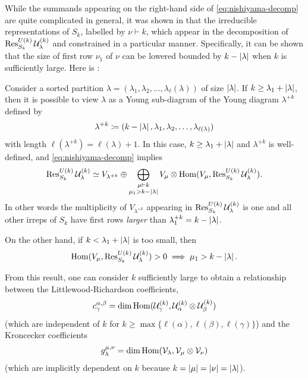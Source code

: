 \documentclass[notitlepage]{article}
\begin{document}
While the summands appearing on the right-hand side of \cref{eq:nishiyama-decomp} are quite complicated in general, it was shown in \cite{christandl2018recoupling} that the irreducible representations of $S_k$, labelled by $\nu \vdash k$, which appear in the decomposition of $\operatorname{Res}^{U(k)}_{S_k} \mathcal U_{\lambda}^{(k)}$ and constrained in a particular manner.
Specifically, it can be shown that the size of first row $\nu_1$ of $\nu$ can be lowered bounded by $k - \left|\lambda\right|$ when $k$ is sufficiently large.
Here is \cite[Lemma 13]{christandl2018recoupling}:
\begin{thm}
    Consider a sorted partition $\lambda = (\lambda_1, \lambda_2, \ldots, \lambda_\ell(\lambda))$ of size $\left|\lambda\right|$.
    If $k \geq \lambda_1 + \left|\lambda\right|$, then it is possible to view $\lambda$ as a Young sub-diagram of the Young diagram $\lambda^{+k}$ defined by
    \begin{equation}
        \lambda^{+k} \coloneqq (k - \left|\lambda\right|, \lambda_1, \lambda_2, \ldots, \lambda_{\ell(\lambda)})
    \end{equation}
    with length $\ell(\lambda^{+k}) = \ell(\lambda) + 1$.
    In this case, $k \geq \lambda_1 + \left|\lambda\right|$ and $\lambda^{+k}$ is well-defined, and \cref{eq:nishiyama-decomp} implies
    \begin{equation}
        \operatorname{Res}^{U(k)}_{S_k} \mathcal U_{\lambda}^{(k)} \simeq V_{\lambda^{+k}} \oplus \bigoplus_{\substack{\mu \vdash k \\ \mu_1 > k - \left|\lambda\right|}} V_{\mu} \otimes \operatorname{Hom}(V_\mu, \operatorname{Res}^{U(k)}_{S_k} \mathcal U_{\lambda}^{(k)}).
    \end{equation}
    In other words the multiplicity of $V_{\lambda^{+k}}$ appearing in $\operatorname{Res}^{U(k)}_{S_k} \mathcal U_{\lambda}^{(k)}$ is one and all other irreps of $S_k$ have first rows \textit{larger} than $\lambda_1^{+k} = k - \left|\lambda\right|$.

    On the other hand, if $k < \lambda_1 + \left|\lambda\right|$ is too small, then
    \begin{equation}
        \operatorname{Hom}(V_\mu, \operatorname{Res}^{U(k)}_{S_k} \mathcal U_{\lambda}^{(k)}) > 0 \implies \mu_1 > k - \left|\lambda\right|.
    \end{equation}
\end{thm}

From this result, one can consider $k$ sufficiently large to obtain a relationship between the Littlewood-Richardson coefficients,
\begin{equation}
    c_{\gamma}^{\alpha, \beta} = \dim \operatorname{Hom} (\mathcal U_{\gamma}^{(k)}, \mathcal U_{\alpha}^{(k)} \otimes \mathcal U_{\beta}^{(k)})
\end{equation}
(which are independent of $k$ for $k \geq \max\{\ell(\alpha), \ell(\beta), \ell(\gamma) \}$) and the Kroncecker coefficients
\begin{equation}
    g_{\lambda}^{\mu, \nu} = \dim \operatorname{Hom} (\mathcal V_{\lambda}, \mathcal V_{\mu} \otimes \mathcal V_{\nu})
\end{equation}
(which are implicitly dependent on $k$ because $k = \left|\mu\right| = \left|\nu\right| = \left|\lambda\right|$).
\end{document}
